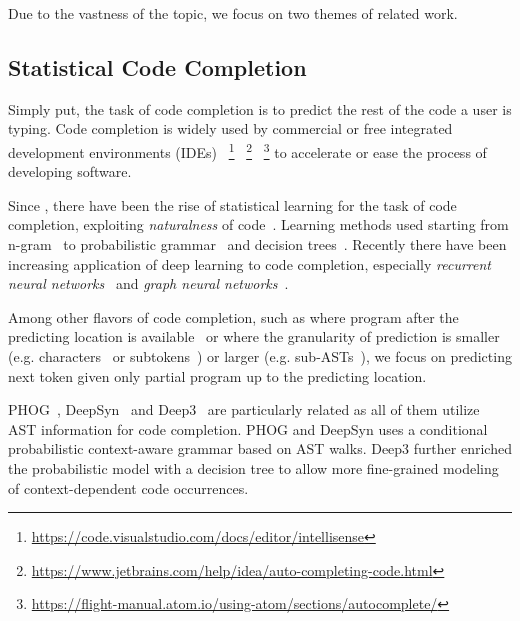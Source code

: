 \documentclass[nonacm, sigconf]{acmart}
\begin{document}
Due to the vastness of the topic, we focus on two themes of related work.
\subsection{Statistical Code Completion}
Simply put, the task of code completion is to predict the rest of the code a user is typing. 
Code completion is widely used by commercial or free integrated development environments (IDEs)
~\footnote{\url{https://code.visualstudio.com/docs/editor/intellisense}}
~\footnote{\url{https://www.jetbrains.com/help/idea/auto-completing-code.html}} ~\footnote{\url{https://flight-manual.atom.io/using-atom/sections/autocomplete/}}
to accelerate or ease the process of developing software.

Since \citet{hindle2016naturalness}, there have been the rise of statistical learning for the task of code completion, exploiting \emph{naturalness} of code~\cite{allamanis2018survey}.
Learning methods used starting from 
n-gram~\cite{nguyen2013statistical-ngram,hindle2016naturalness} 
to probabilistic grammar~\cite{allamanis2014mining,bielik2016phog} 
and decision trees~\cite{raychev2016probabilistic-deep3-eth-dt}.
Recently there have been increasing application of deep learning to code completion, especially 
\emph{recurrent neural networks}~\citep{liu2016neural-code-completion,li2018code-rnn-attn,liu2020modeling-stack-lstm} 
and \emph{graph neural networks}~\citep{allamanis2018learning-graph,brockschmidt2018generative-graph,yang2019improve}.

Among other flavors of code completion, such as
where program after the predicting location is available~\citep{raychev2014code-api,allamanis2018learning-graph,brockschmidt2018generative-graph,alon2020structural-anygen}
or where the granularity of prediction is smaller (e.g. characters~\citep{bielik2016program-character} or subtokens~\citep{karampatsis2020big-bpe})
or larger (e.g. sub-ASTs~\citep{alon2020structural-anygen}),
we focus on predicting next token given only partial program up to the predicting location.

PHOG~\citep{bielik2016phog}, DeepSyn~\citep{raychev2016learning-noisy} and Deep3~\citep{raychev2016probabilistic-deep3-eth-dt} are particularly related as all of them utilize AST information for code completion.
PHOG and DeepSyn uses a conditional probabilistic context-aware grammar based on AST walks.
Deep3 further enriched the probabilistic model with a decision tree to allow more fine-grained modeling of context-dependent code occurrences.  
\end{document}
